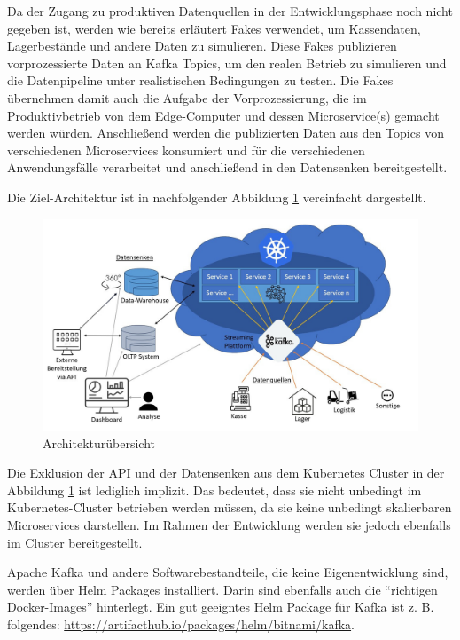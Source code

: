 \documentclass[%
pdftex,
oneside,			%
11pt,				%
parskip=half,		%
headheight = 12pt,	%
headsepline,		%
footsepline,		%
footheight = 16pt,	%
abstracton,		%
DIV=calc,		%
BCOR=8mm,		%
headinclude=false,	%
footinclude=false,	%
listof=totoc,		%
toc=bibliography,	%
]{scrreprt}	%
\begin{document}
    Da der Zugang zu produktiven Datenquellen in der Entwicklungsphase noch nicht gegeben ist, werden wie bereits erläutert Fakes verwendet, um Kassendaten, Lagerbestände und andere Daten zu simulieren.
    Diese Fakes publizieren vorprozessierte Daten an Kafka Topics, um den realen Betrieb zu simulieren und die Datenpipeline unter realistischen Bedingungen zu testen.
    Die Fakes übernehmen damit auch die Aufgabe der Vorprozessierung, die im Produktivbetrieb von dem Edge-Computer und dessen Microservice(s) gemacht werden würden.
    Anschließend werden die publizierten Daten aus den Topics von verschiedenen Microservices konsumiert und für die verschiedenen Anwendungsfälle verarbeitet und anschließend in den Datensenken bereitgestellt.

    Die Ziel-Architektur ist in nachfolgender Abbildung \ref{fig:architekturentwurf} vereinfacht dargestellt.

    \begin{figure}[H]
        \centering
        \includegraphics[width=1\textwidth]{assets/architekturentwurf.jpg}
        \caption{Architekturübersicht}
        \label{fig:architekturentwurf}
    \end{figure}

    Die Exklusion der API und der Datensenken aus dem Kubernetes Cluster in der Abbildung \ref{fig:architekturentwurf} ist lediglich implizit.
    Das bedeutet, dass sie nicht unbedingt im Kubernetes-Cluster betrieben werden müssen, da sie keine unbedingt skalierbaren Microservices darstellen.
    Im Rahmen der Entwicklung werden sie jedoch ebenfalls im Cluster bereitgestellt.

    Apache Kafka und andere Softwarebestandteile, die keine Eigenentwicklung sind, werden über Helm Packages installiert.
    Darin sind ebenfalls auch die \enquote{richtigen Docker-Images} hinterlegt.
    Ein gut geeigntes Helm Package für Kafka ist z. B. folgendes: \url{https://artifacthub.io/packages/helm/bitnami/kafka}.
\end{document}

